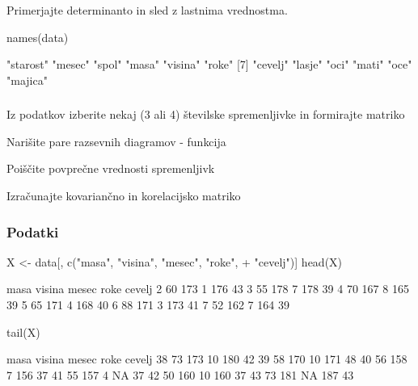 Primerjajte determinanto in sled z lastnima vrednostma.

\begin{Schunk}
\begin{Sinput}
 names(data)
\end{Sinput}
\begin{Soutput}
 [1] "starost" "mesec"   "spol"    "masa"    "visina"  "roke"   
 [7] "cevelj"  "lasje"   "oci"     "mati"    "oce"     "majica" 
\end{Soutput}
\end{Schunk}

\begin{frame}[fragile]
\frametitle{}
\begin{itemize*}
  \item Iz podatkov  izberite nekaj (3 ali 4) številske spremenljivke in formirajte matriko 
    \item Narišite pare razsevnih diagramov - funkcija 
  \item Poiščite povprečne vrednosti spremenljivk
  \item Izračunajte kovariančno in korelacijsko matriko
\end{itemize*}
\end{frame}

\begin{frame}[fragile]
\frametitle{Podatki}
\begin{Schunk}
\begin{Sinput}
 X <- data[, c("masa", "visina", "mesec", "roke", 
+     "cevelj")]
 head(X)
\end{Sinput}
\begin{Soutput}
  masa visina mesec roke cevelj
2   60    173     1  176     43
3   55    178     7  178     39
4   70    167     8  165     39
5   65    171     4  168     40
6   88    171     3  173     41
7   52    162     7  164     39
\end{Soutput}
\begin{Sinput}
 tail(X)
\end{Sinput}
\begin{Soutput}
   masa visina mesec roke cevelj
38   73    173    10  180     42
39   58    170    10  171     48
40   56    158     7  156     37
41   55    157     4   NA     37
42   50    160    10  160     37
43   73    181    NA  187     43
\end{Soutput}
\end{Schunk}
\end{frame}

